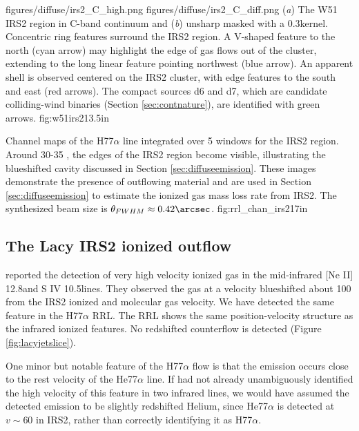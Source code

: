 \FigureTwo
{figures/diffuse/irs2_C_high.png}
{figures/diffuse/irs2_C_diff.png}
{(\textit{a}) The W51 IRS2 region in C-band continuum and (\textit{b}) unsharp
masked with a 0.3\arcsec kernel.  Concentric ring features surround the IRS2
region.  A V-shaped feature to the north (cyan arrow) may highlight the edge of
gas flows out of the cluster, extending to the long linear feature pointing
northwest (blue arrow).  An
apparent shell is observed centered on the IRS2 cluster, with edge
features to the south and east (red arrows).  The compact sources d6 and d7,
which are candidate colliding-wind binaries (Section \ref{sec:contnature}),
are identified with green arrows.
}
{fig:w51irs2}{1}{3.5in}

{Channel maps of the H77$\alpha$ line integrated over 5 \kms windows
for the IRS2 region.  Around 30-35 \kms, the edges of the IRS2 region become
visible, illustrating the blueshifted cavity discussed in Section
\ref{sec:diffuseemission}.  These images demonstrate the presence of outflowing
material and are used in Section \ref{sec:diffuseemission} to estimate the
ionized gas mass loss rate from IRS2.
The synthesized beam size is $\theta_{FWHM}\approx0.42\arcsec$.
}
{fig:rrl_chan_irs2}{1}{7in}


\subsection{The Lacy IRS2 ionized outflow}
\label{sec:lacyjet}
\citet{Lacy2007a} reported the detection of very high velocity ionized gas
in the mid-infrared [Ne II] 12.8\um and S IV 10.5\um lines.  They observed the
gas at a velocity blueshifted about 100 \kms from the IRS2 ionized and molecular
gas velocity.  We have detected the same feature in the H77$\alpha$ RRL.
The RRL shows the same position-velocity structure as the infrared ionized
features.  No redshifted counterflow is detected (Figure \ref{fig:lacyjetslice}).

One minor but notable feature of the H77$\alpha$ flow is that the emission
occurs close to the rest velocity of the He77$\alpha$ line.  If
\citet{Lacy2007a} had not already unambiguously identified the high velocity of
this feature in two infrared lines, we would have assumed the detected emission
to be slightly redshifted Helium, since He77$\alpha$ is detected at $v\sim60$
\kms in IRS2, rather than correctly identifying it as H77$\alpha$.

